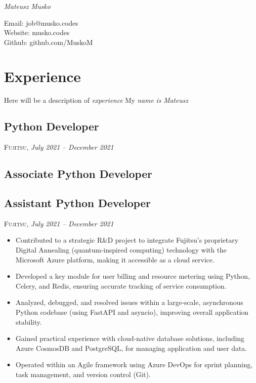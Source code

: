 \documentclass[a4paper, 12pt]{article} %
\begin{document}
{\itshape\huge Mateusz Musko\par}
Email: job@musko.codes \\
Website: musko.codes \\
Github: github.com/MuskoM \\


\section{Experience}
Here will be a description of \emph{experience} %
My \emph{name is \emph{Mateusz}} %

\subsection{Python Developer}
\textsc{Fujitsu}, \textit{July 2021 – December 2021} \\
\lipsum

\subsection{Associate Python Developer}
\lipsum

\subsection{Assistant Python Developer}
\textsc{Fujitsu}, \textit{July 2021 – December 2021} \\
\begin{itemize}
    \itemsep -0.3em %
    \item Contributed to a strategic R\&D project to integrate Fujitsu's proprietary Digital Annealing (quantum-inspired computing) technology with the Microsoft Azure platform, making it accessible as a cloud service.
    \item Developed a key module for user billing and resource metering using Python, Celery, and Redis, ensuring accurate tracking of service consumption.
    \item Analyzed, debugged, and resolved issues within a large-scale, asynchronous Python codebase (using FastAPI and asyncio), improving overall application stability.
    \item Gained practical experience with cloud-native database solutions, including Azure CosmosDB and PostgreSQL, for managing application and user data.
    \item Operated within an Agile framework using Azure DevOps for sprint planning, task management, and version control (Git).
\end{itemize}
\end{document}
